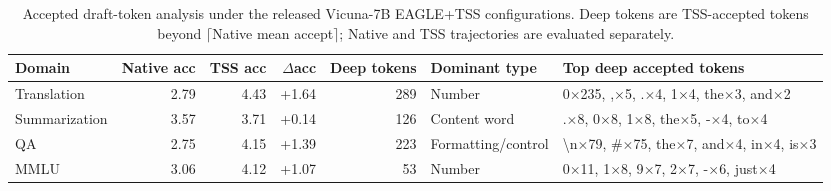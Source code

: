 \begin{table}[t]
\centering
\small
\caption{Accepted draft-token analysis under the released Vicuna-7B EAGLE+TSS configurations. Deep tokens are TSS-accepted tokens beyond $\lceil$Native mean accept$\rceil$; Native and TSS trajectories are evaluated separately.}
\label{tab:accepted_draft_tokens}
\begin{tabular}{lrrrrll}
\toprule
Domain & Native acc & TSS acc & $\Delta$acc & Deep tokens & Dominant type & Top deep accepted tokens \\
\midrule
Translation & 2.79 & 4.43 & +1.64 & 289 & Number & 0$\times$235, ,$\times$5, .$\times$4, 1$\times$4, the$\times$3, and$\times$2 \\
Summarization & 3.57 & 3.71 & +0.14 & 126 & Content word & .$\times$8, 0$\times$8, 1$\times$8, the$\times$5, -$\times$4, to$\times$4 \\
QA & 2.75 & 4.15 & +1.39 & 223 & Formatting/control & \textbackslash{}n$\times$79, \#$\times$75, the$\times$7, and$\times$4, in$\times$4, is$\times$3 \\
MMLU & 3.06 & 4.12 & +1.07 & 53 & Number & 0$\times$11, 1$\times$8, 9$\times$7, 2$\times$7, -$\times$6, just$\times$4 \\
\bottomrule
\end{tabular}
\end{table}
